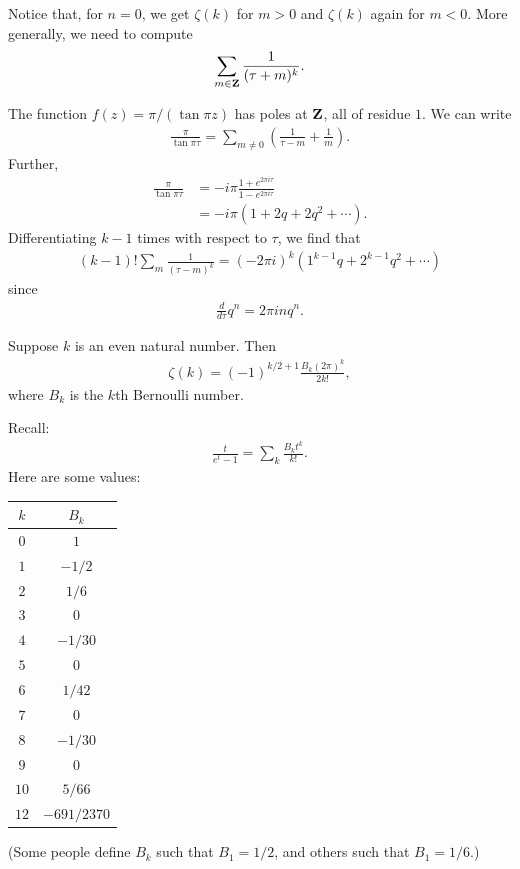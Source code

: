 \documentclass[11pt, oneside,margin=1in]{article}
\begin{document}
Notice that, for $n=0$, we get $\zeta(k)$ for $m>0$ and $\zeta(k)$ again for $m<0$. More generally, we need to compute 
\begin{align*}
	\sum_{m\in\mathbf Z}^{} \frac{1}{(\tau + m) ^k}.
\end{align*}

The function $f(z) = \pi/(\tan \pi z)$ has poles at $\mathbf Z$, all of residue $1$. We can write
\begin{align*}
	\frac{\pi}{\tan \pi \tau} = \sum_{m\ne 0}^{} \left( \frac{1}{\tau - m}+\frac{1}{m} \right
		).
\end{align*}
Further,
\begin{align*}
	\frac{\pi}{\tan \pi \tau}&= -i\pi \frac{1+e^{2\pi i\tau}}{1-e^{2\pi i\tau}} \\
				 &= -i\pi (1+2q+2q^2 + \cdots).
\end{align*}
Differentiating $k-1$ times with respect to $\tau$, we find that 
\begin{align*}
	(k-1) ! \sum_{m}^{} \frac{1}{(\tau-m) ^k} = (-2\pi i)^k  (1^{k-1}q + 2^{k-1}q^2 + \cdots)
\end{align*}
since
\begin{align*}
	\frac{d}{d\tau} q^n = 2\pi i n q^n.
\end{align*}

\begin{proposition}[ ]\label{}\text{}
Suppose $k$ is an even natural number. Then
	\begin{align*}
	\zeta(k) = (-1)^{k/2 + 1} \frac{B_k (2\pi)^k}{2k!},
\end{align*}
where $B_k$ is the $k$th Bernoulli number.
\end{proposition}

Recall:
\begin{align*}
	\frac{t}{e^t-1}=\sum_{k}^{} \frac{B_kt^k}{k!}.
\end{align*}
Here are some values:
\begin{center}
\begin{tabular}{cc}
$k$ & $B_k$\\
\midrule
$0 $ & $1 $\\
$ 1$ & $-1/2 $\\
$2 $ & $1/6 $\\
$3 $ & $0 $\\
$4 $ & $-1/30 $\\
$ 5$ & $0 $\\
$6 $ & $1/42 $\\
$7 $ & $0 $\\
$8 $ & $-1/30 $\\
$ 9$ & $0 $\\
$10 $ & $5/66 $\\
$12 $ & $-691/2370 $\\
\end{tabular}
\end{center}
(Some people define $B_k$ such that $B_1=1/2$, and others such that $B_1 = 1/6$.)
\end{document}
